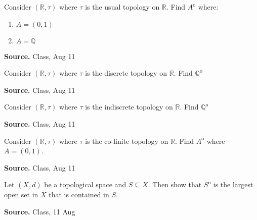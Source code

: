 \documentclass[12pt,twoside]{report}
\newenvironment*{source}{\hfill\scriptsize\textbf{Source.}\space}{\par}
\begin{document}
\begin{samepage}
\begin{ex}
Consider $\left (\mathbb{R}, \tau\right )$ where $\tau$ is the usual topology on $\mathbb{R}$.
Find $A^\mathrm{o}$ where:
    \begin{enumerate}
        \item $A = \left (0,1\right )$
        \item $A = \mathbb{Q}$
    \end{enumerate}
\end{ex}
\begin{source}
Class, Aug 11
\end{source}
\end{samepage}

\begin{samepage}
\begin{ex}
Consider $\left (\mathbb{R}, \tau\right )$ where $\tau$ is the discrete topology on $\mathbb{R}$.
Find $\mathbb{Q} ^\mathrm{o}$
\end{ex}
\begin{source}
Class, Aug 11
\end{source}
\end{samepage}

\begin{samepage}
\begin{ex}
Consider $\left (\mathbb{R}, \tau\right )$ where $\tau$ is the indiscrete topology on $\mathbb{R}$.
Find $\mathbb{Q} ^\mathrm{o}$
\end{ex}
\begin{source}
Class, Aug 11
\end{source}
\end{samepage}

\begin{samepage}
\begin{ex}
Consider $\left (\mathbb{R}, \tau\right )$ where $\tau$ is the co-finite topology on $\mathbb{R}$.
Find $A^\mathrm{o}$ where $A = \left (0,1\right )$.
\end{ex}
\begin{source}
Class, Aug 11
\end{source}
\end{samepage}

\begin{samepage}
\begin{ex}
Let $\left (X,d\right )$ be a topological space and $S \subseteq X$. Then show that $S ^\mathrm{o}$ is the largest open set in $X$ that is contained in $S$.
\end{ex}
\begin{source}
Class, 11 Aug
\end{source}
\end{samepage}
\end{document}
